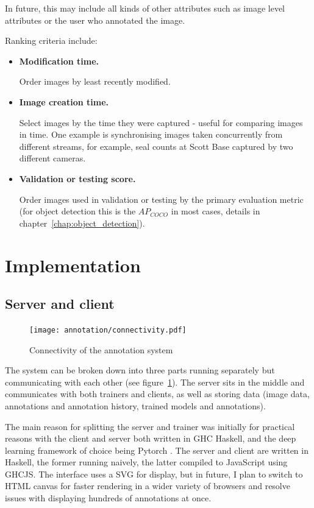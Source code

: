 In future, this may include all kinds of other attributes such as image level attributes or the user who annotated the image.

Ranking criteria include:

\begin{itemize}
    \item {\bf Modification time.} \par
Order images by least recently modified.
    \item {\bf Image creation time. } \par
Select images by the time they were captured - useful for comparing images in time. One example is synchronising images taken concurrently from different streams, for example, seal counts at Scott Base captured by two different cameras.
    \item {\bf Validation or testing score. } \par
Order images used in validation or testing by the primary evaluation metric (for object detection this is the $AP_{COCO}$ in most cases, details in chapter~\ref{chap:object_detection}).
\end{itemize}

\section {Implementation}

\subsection{Server and client}

\begin{figure}[h!]
  \centering
  \texttt{[image: annotation/connectivity.pdf]}
  \caption{Connectivity of the annotation system}  
  \label{fig:connectivity}
\end{figure}

The system can be broken down into three parts running separately but communicating with each other (see figure~\ref{fig:connectivity}). The server sits in the middle and communicates with both trainers and clients, as well as storing data (image data, annotations and annotation history, trained models and annotations).

The main reason for splitting the server and trainer was initially for practical reasons with the client and server both written in \gls{GHC} Haskell, and the deep learning framework of choice being Pytorch \cite{Paszke2017}. The server and client are written in Haskell, the former running naively, the latter compiled to JavaScript using \gls{GHCJS}. The interface uses a \gls{SVG} for display, but in future, I plan to switch to \gls{HTML} canvas for faster rendering in a wider variety of browsers and resolve issues with displaying hundreds of annotations at once.

